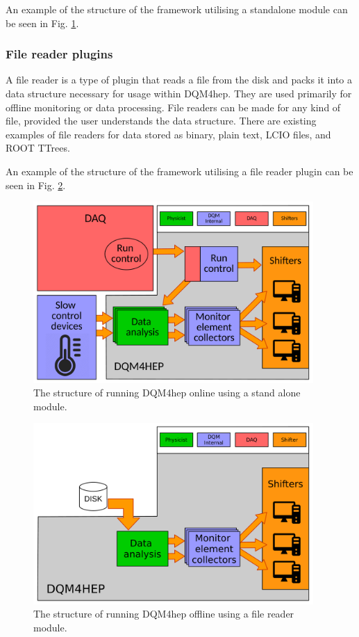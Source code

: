An example of the structure of the framework utilising a standalone module can be seen in Fig. \ref{figure:daq/dqm4hep/standalone-module}.

\subsubsection{File reader plugins}
A file reader is a type of plugin that reads a file from the disk and packs it into a data structure necessary for usage within \acrshort{DQM4hep}. They are used primarily for offline monitoring or data processing. File readers can be made for any kind of file, provided the user understands the data structure. There are existing examples of file readers for data stored as binary, plain text, \acrshort{LCIO} files, and ROOT TTrees. 

An example of the structure of the framework utilising a file reader plugin can be seen in Fig. \ref{figure:daq/dqm4hep/file-reader}.

\begin{figure}[p]
	\centering
	\includegraphics[width=0.95\textwidth]{../Pictures/StandaloneModuleArchitecture.pdf}
	\caption{The structure of running \acrshort{DQM4hep} online using a stand alone module.}
	\label{figure:daq/dqm4hep/standalone-module}
\end{figure}

\begin{figure}[p]
	\centering
	\includegraphics[width=0.95\textwidth]{../Pictures/FileReaderModuleArchitecture.pdf}
	\caption{The structure of running \acrshort{DQM4hep} offline using a file reader module.}
	\label{figure:daq/dqm4hep/file-reader}
\end{figure}

